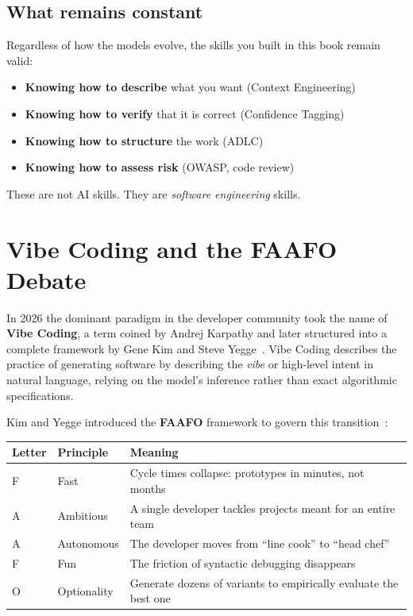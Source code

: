 \subsection{What remains constant}

Regardless of how the models evolve, the skills you built in this book remain valid:
\begin{itemize}
  \item \textbf{Knowing how to describe} what you want (Context Engineering)
  \item \textbf{Knowing how to verify} that it is correct (Confidence Tagging)
  \item \textbf{Knowing how to structure} the work (ADLC)
  \item \textbf{Knowing how to assess risk} (OWASP, code review)
\end{itemize}

These are not AI skills. They are \emph{software engineering} skills.

\section{Vibe Coding and the FAAFO Debate}

In 2026 the dominant paradigm in the developer community took the name of \textbf{Vibe Coding}, a term coined by Andrej Karpathy and later structured into a complete framework by Gene Kim and Steve Yegge~\cite{kim-yegge:vibe-coding}. Vibe Coding describes the practice of generating software by describing the \textit{vibe} or high-level intent in natural language, relying on the model's inference rather than exact algorithmic specifications.

Kim and Yegge introduced the \textbf{FAAFO} framework to govern this transition~\cite{kim-yegge:vibe-coding,yegge:tips}:

\begin{center}
\begin{tabularx}{\textwidth}{l l X}
\toprule
\textbf{Letter} & \textbf{Principle} & \textbf{Meaning} \\
\midrule
F & Fast & Cycle times collapse: prototypes in minutes, not months \\
A & Ambitious & A single developer tackles projects meant for an entire team \\
A & Autonomous & The developer moves from ``line cook'' to ``head chef'' \\
F & Fun & The friction of syntactic debugging disappears \\
O & Optionality & Generate dozens of variants to empirically evaluate the best one \\
\bottomrule
\end{tabularx}
\end{center}

